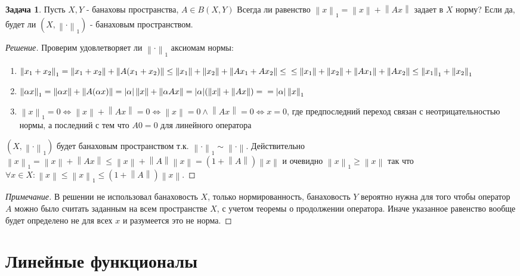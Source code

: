 \documentclass[12pt,a4paper]{article}
\theoremstyle{definition}
\newtheorem{exercise}{Задача}[section]
\newenvironment{solution}
{\renewcommand\qedsymbol{$\blacksquare$}\begin{proof}[Решение]}
{\end{proof}}
\newenvironment{note}
{\renewcommand\qedsymbol{}\begin{proof}[Примечание]}
	{\end{proof}}
\newcommand{\norm}[1]{\left\lVert#1\right\rVert}
\begin{document}
	\begin{exercise}
		Пусть $X,Y$ - банаховы пространства, $A\in B(X,Y)$ Всегда ли равенство $\norm{x}_1 = \norm{x} + \norm{Ax}$ задает в $X$ норму? Если да, будет ли $(X, \norm{\cdot}_1)$ - банаховым пространством.
	\end{exercise}
	\begin{solution}
		Проверим удовлетворяет ли $\norm{\cdot}_1$ аксиомам нормы:
		\begin{enumerate}
			\item $\norm{x_1 + x_2}_1 = \norm{x_1 + x_2} + \norm{A(x_1 + x_2)} \leq \norm{x_1} + \norm{x_2} + \norm{Ax_1 + Ax_2} \leq \newline
			\leq \norm{x_1} + \norm{x_2} + \norm{Ax_1} + \norm{Ax_2}
			\leq \norm{x_1}_1 + \norm{x_2}_1$
			
			\item $\norm{\alpha x}_1 = \norm{\alpha x} + \norm{A(\alpha x)} = |\alpha| \norm{x} + \norm{\alpha Ax} = |\alpha| (\norm{x} + \norm{Ax}) = \newline = |\alpha|\norm{x}_1$
			
			\item $\norm{x}_1 = 0 \Leftrightarrow \norm{x} + \norm{Ax} = 0 \Leftrightarrow \norm{x} = 0 \wedge \norm{Ax} = 0 \Leftrightarrow x = 0$, где предпоследний переход связан с неотрицательностью нормы, а последний с тем что $A0=0$ для линейного оператора
		\end{enumerate}
		$(X, \norm{\cdot}_1)$ будет банаховым пространством т.к. $\norm{\cdot}_1 \sim \norm{\cdot}$. Действительно \\ $\norm{x}_1 = \norm{x} + \norm{Ax} \leq \norm{x} + \norm{A}\norm{x} = (1 + \norm{A})\norm{x}$ и очевидно $\norm{x}_1 \geq \norm{x}$ так что
		$\forall x\in X : \norm{x} \leq \norm{x}_1 \leq (1 + \norm{A})\norm{x}$.
	\end{solution}

	\begin{note}
		В решении не использовал банаховость $X$, только нормированность, банаховость $Y$ вероятно нужна для того чтобы оператор $A$ можно было считать заданным на всем пространстве $X$, с учетом теоремы о продолжении оператора. Иначе указанное равенство вообще будет определено не для всех $x$ и разумеется это не норма.
	\end{note}

	\section{Линейные функционалы}
	
\end{document}
